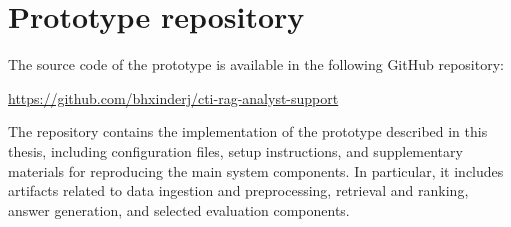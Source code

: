\chapter{Prototype repository}
\label{app:repository}

The source code of the prototype is available in the following GitHub
repository:

\begin{center}
    \url{https://github.com/bhxinderj/cti-rag-analyst-support}
\end{center}

The repository contains the implementation of the prototype described in
this thesis, including configuration files, setup instructions, and
supplementary materials for reproducing the main system components. In
particular, it includes artifacts related to data ingestion and
preprocessing, retrieval and ranking, answer generation, and selected
evaluation components.

